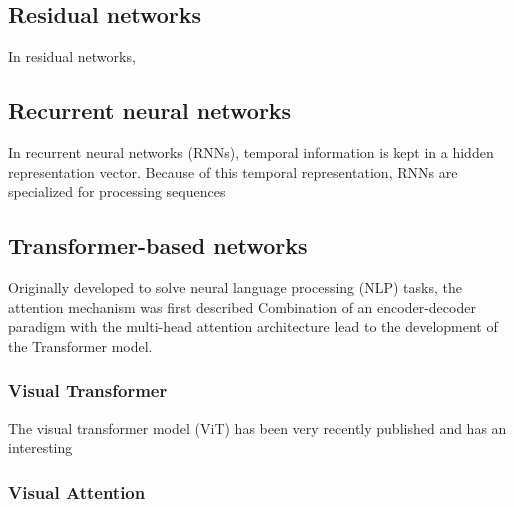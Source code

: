 \subsection{Residual networks}

In residual networks, 

\subsection{Recurrent neural networks}

In recurrent neural networks (RNNs), temporal information is kept in a hidden representation vector. Because of this temporal representation, RNNs are specialized for processing sequences

\subsection{Transformer-based networks}

Originally developed to solve neural language processing (NLP) tasks, the attention mechanism was first described \cite{vaswani_attention_2023}
Combination of an encoder-decoder paradigm with the multi-head attention architecture lead to the development of the Transformer model.


\subsubsection{Visual Transformer}

The visual transformer model (ViT) has been very recently published and has an interesting 

\subsubsection{Visual Attention}